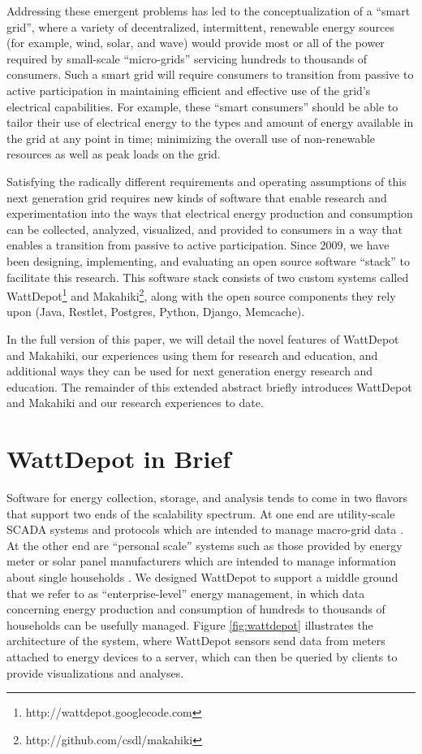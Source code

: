 \documentclass{acm_proc_article-sp}
\begin{document}
Addressing these emergent problems has led to the conceptualization of a ``smart grid'',
where a variety of decentralized, intermittent, renewable energy sources (for example,
wind, solar, and wave) would provide most or all of the power required by small-scale
``micro-grids'' servicing hundreds to thousands of consumers. Such a smart
grid will require consumers to transition from passive to active participation in
maintaining efficient and effective use of the grid's electrical capabilities.  For
example, these ``smart consumers'' should be able to tailor their use of electrical energy
to the types and amount of energy available in the grid at any point in time; minimizing
the overall use of non-renewable resources as well as peak loads on the grid.

Satisfying the radically different requirements and operating assumptions of this next
generation grid requires new kinds of software that enable research and experimentation
into the ways that electrical energy production and consumption can be collected,
analyzed, visualized, and provided to consumers in a way that enables a transition from
passive to active participation.  Since 2009, we have been designing, implementing, and
evaluating an open source software ``stack'' to facilitate this research.  This software
stack consists of two custom systems called
WattDepot\footnote{http://wattdepot.googlecode.com} and
Makahiki\footnote{http://github.com/csdl/makahiki}, along with the open source components
they rely upon (Java, Restlet, Postgres, Python, Django, Memcache).

In the full version of this paper, we will detail the novel features of WattDepot and
Makahiki, our experiences using them for research and education, and additional ways they
can be used for next generation energy research and
education.  The remainder of this extended abstract briefly introduces WattDepot and
Makahiki and our research experiences to date.

\section{WattDepot in Brief}

Software for energy collection, storage, and analysis tends to come in two flavors that
support two ends of the scalability spectrum.  At one end are utility-scale SCADA systems
and protocols which are intended to manage macro-grid data
\cite{SmartEnergy2.0,OSHAN,OpenPDC}.  At the other end are ``personal scale'' systems such
as those provided by energy meter or solar panel manufacturers which are intended to
manage information about single households \cite{TED,EMS100}.  We designed WattDepot to
support a middle ground that we refer to as ``enterprise-level'' energy management, in
which data concerning energy production and consumption of hundreds to thousands of
households can be usefully managed.  Figure \ref{fig:wattdepot} illustrates the
architecture of the system, where WattDepot sensors send data from meters attached to
energy devices to a server, which can then be queried by clients to provide visualizations
and analyses.
\end{document}
